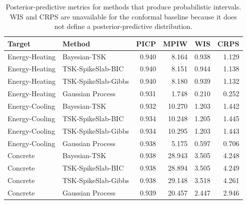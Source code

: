 \begin{table}[htbp]
\centering
\caption{Posterior-predictive metrics for methods that produce probabilistic intervals. WIS and CRPS are unavailable for the conformal baseline because it does not define a posterior-predictive distribution.}
\label{tab:predictive}
\scriptsize
\setlength{\tabcolsep}{3pt}
\begin{tabular}{llrrrr}
\toprule
Target & Method & PICP & MPIW & WIS & CRPS \\
\midrule
Energy-Heating & Bayesian-TSK & 0.940 & 8.164 & 0.938 & 1.129 \\
Energy-Heating & TSK-SpikeSlab-BIC & 0.940 & 8.151 & 0.944 & 1.138 \\
Energy-Heating & TSK-SpikeSlab-Gibbs & 0.940 & 8.180 & 0.939 & 1.132 \\
Energy-Heating & Gaussian Process & 0.931 & 1.748 & 0.210 & 0.252 \\
Energy-Cooling & Bayesian-TSK & 0.932 & 10.270 & 1.203 & 1.442 \\
Energy-Cooling & TSK-SpikeSlab-BIC & 0.934 & 10.248 & 1.205 & 1.445 \\
Energy-Cooling & TSK-SpikeSlab-Gibbs & 0.934 & 10.295 & 1.203 & 1.443 \\
Energy-Cooling & Gaussian Process & 0.938 & 5.175 & 0.597 & 0.706 \\
Concrete & Bayesian-TSK & 0.938 & 28.943 & 3.505 & 4.248 \\
Concrete & TSK-SpikeSlab-BIC & 0.938 & 28.894 & 3.505 & 4.249 \\
Concrete & TSK-SpikeSlab-Gibbs & 0.938 & 29.148 & 3.518 & 4.261 \\
Concrete & Gaussian Process & 0.939 & 20.457 & 2.447 & 2.946 \\
\bottomrule
\end{tabular}
\end{table}
